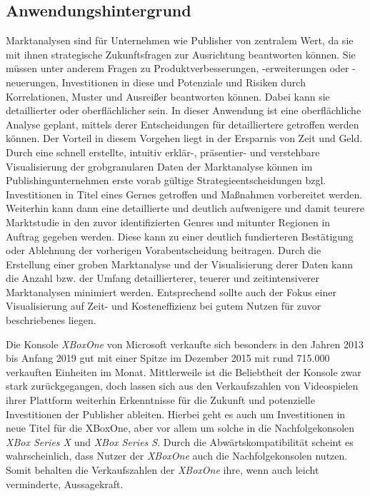 \documentclass[usegeometry=true]{scrartcl}
\begin{document}
\subsection{Anwendungshintergrund}

Marktanalysen sind für Unternehmen wie Publisher von zentralem Wert, da sie mit ihnen strategische Zukunftsfragen zur Ausrichtung beantworten können. 
Sie müssen unter anderem Fragen zu Produktverbesserungen, -erweiterungen oder -neuerungen, Investitionen in diese und Potenziale und Risiken durch Korrelationen, Muster und Ausreißer beantworten können.\cite{Fleig.2020}
Dabei kann sie detaillierter oder oberflächlicher sein. In dieser Anwendung ist eine oberflächliche Analyse geplant, mittels derer Entscheidungen für detailliertere getroffen werden können.
Der Vorteil in diesem Vorgehen liegt in der Ersparnis von Zeit und Geld. 
Durch eine schnell erstellte, intuitiv erklär-, präsentier- und verstehbare Visualisierung der grobgranularen Daten der Marktanalyse können im Publishingunternehmen erste vorab gültige Strategieentscheidungen bzgl. Investitionen in Titel eines Gernes getroffen und Maßnahmen vorbereitet werden.
Weiterhin kann dann eine detaillierte und deutlich aufwenigere und damit teurere Marktstudie in den zuvor identifizierten Genres und mitunter Regionen in Auftrag gegeben werden. 
Diese kann zu einer deutlich fundierteren Bestätigung oder Ablehnung der vorherigen Vorabentscheidung beitragen. 
Durch die Erstellung einer groben Marktanalyse und der Visualisierung derer Daten kann die Anzahl bzw. der Umfang detaillierterer, teuerer und zeitintensiverer Marktanalysen minimiert werden.
Entsprechend sollte auch der Fokus einer Visualisierung auf Zeit- und Kosteneffizienz bei gutem Nutzen für zuvor beschriebenes liegen.

Die Konsole \textit{XBoxOne} von Microsoft verkaufte sich besonders in den Jahren 2013 bis Anfang 2019 gut mit einer Spitze im Dezember 2015 mit rund 715.000 verkauften Einheiten im Monat.
Mittlerweile ist die Beliebtheit der Konsole zwar stark zurückgegangen, doch lassen sich aus den Verkaufszahlen von Videospielen ihrer Plattform weiterhin Erkenntnisse für die Zukunft und potenzielle Investitionen der Publisher ableiten.\cite{Statista.2022}
Hierbei geht es auch um Investitionen in neue Titel für die XBoxOne, aber vor allem um solche in die Nachfolgekonsolen \textit{XBox Series X} und \textit{XBox Series S}. 
Durch die Abwärtskompatibilität scheint es wahrscheinlich, dass Nutzer der \textit{XBoxOne} auch die Nachfolgekonsolen nutzen.\cite{GamesWirtschaft.2021} 
Somit behalten die Verkaufszahlen der \textit{XBoxOne} ihre, wenn auch leicht verminderte, Aussagekraft.
\end{document}
